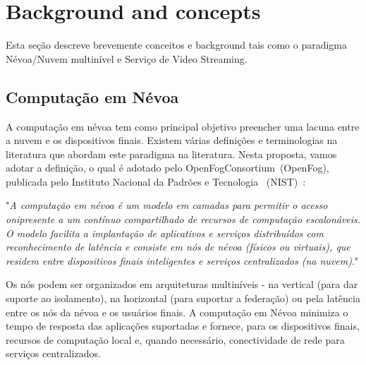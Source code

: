 \clearpage
\section{Background and concepts}
\label{ch:background}

Esta seção descreve brevemente conceitos e background tais como o paradigma Névoa/Nuvem multinível e Serviço de Video Streaming.

\subsection{Computação em Névoa}

A computação em névoa tem como principal objetivo preencher uma lacuna entre a nuvem e os dispositivos finais. Existem várias definições e terminologias na literatura que abordam este paradigma na literatura. Nesta proposta, vamos adotar a definição, o qual é adotado pelo OpenFogConsortium~(OpenFog), publicada pelo Instituto Nacional da Padrões e Tecnologia%
~(NIST)~\cite{NIST2018-FogComputingConceptualModel}: 

\begin{displayquote}

"\textit{A computação em névoa é um modelo em camadas para permitir o acesso onipresente a um contínuo compartilhado de recursos de computação escalonáveis. O modelo facilita a implantação de aplicativos e serviços distribuídos com reconhecimento de latência e consiste em nós de névoa (físicos ou virtuais), que residem entre dispositivos finais inteligentes e serviços centralizados (na nuvem)}."

\end{displayquote}

Os nós podem ser organizados em arquiteturas multiníveis - na vertical (para dar suporte ao isolamento), na horizontal (para suportar a federação) ou pela latência entre os nós da névoa e os usuários finais. A computação em Névoa minimiza o tempo de resposta das aplicações suportadas e fornece, para os dispositivos finais, recursos de computação local e, quando necessário, conectividade de rede para serviços centralizados. %

